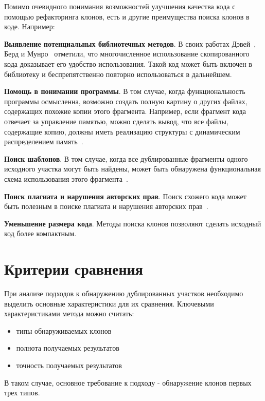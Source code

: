 Помимо очевидного понимания возможностей улучшения качества кода с помощью рефакторинга клонов, есть и другие преимущества поиска клонов в коде. Например: 

\textbf{Выявление потенциальных библиотечных методов}. В своих работах Дэвей~\cite{davey}, Берд и Мунро~\cite{burdmunro} отметили, что многочисленное использование скопированного кода доказывает его удобство использования. Такой код может быть включен в библиотеку и беспрепятственно повторно использоваться в дальнейшем.

\textbf{Помощь в понимании программы}. В том случае, когда функциональность программы осмысленна, возможно создать полную картину о других файлах, содержащих похожие копии этого фрагмента. Например, если фрагмент кода отвечает за управление памятью, можно сделать вывод, что все файлы, содержащие копию, должны иметь реализацию структуры с динамическим распределением память~\cite{memex}.

\textbf{Поиск шаблонов}. В том случае, когда все дублированные фрагменты одного исходного участка могут быть найдены, может быть обнаружена функциональная схема использования этого фрагмента~\cite{memex}.

\textbf{Поиск плагиата и нарушения авторских прав}. Поиск схожего кода может быть полезным в поиске плагиата и нарушения авторских прав~\cite{plagiat}.

\textbf{Уменьшение размера кода}. Методы поиска клонов позволяют сделать исходный код более компактным.

\section{Критерии сравнения}

При анализе подходов к обнаружению дублированных участков необходимо выделить основные характеристики для их сравнения. Ключевыми характеристиками метода можно считать:
\begin{itemize}
\setlength\itemsep{0mm}
\item типы обнаруживаемых клонов
\item полнота получаемых результатов
\item точность получаемых результатов
\end{itemize}

В таком случае, основное требование к подходу - обнаружение клонов первых трех типов.

